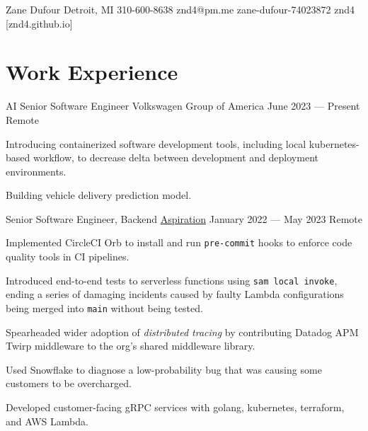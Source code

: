 \documentclass[letterpaper]{resume_config}
\newcommand{\code}[1]{\colorbox{light-gray}{\texttt{#1}}}
\begin{document}
\Header
    {Zane Dufour} %
    {Detroit, MI} %
    {310-600-8638} %
    {znd4@pm.me} %
    {zane-dufour-74023872} %
    {znd4} %
    [znd4.github.io] %


\section{Work Experience}

\WorkExperience
    {AI Senior Software Engineer} %
    {Volkswagen Group of America} %
    {June 2023 --- Present} %
    {Remote} %
    {
        \item Introducing containerized software development tools, including local kubernetes-based workflow, to decrease delta between development and deployment environments.
        \item Building vehicle delivery prediction model.
    } 

\WorkExperience
    {Senior Software Engineer, Backend} %
    {\href{https://www.aspiration.com/}{Aspiration}} %
    {January 2022 --- May 2023} %
    {Remote} %
    {
        \item Implemented CircleCI Orb to install and run \code{pre-commit} hooks to enforce code quality tools in CI pipelines.
        \item Introduced end-to-end tests to serverless functions using \code{sam local invoke}, ending a series of damaging incidents caused by faulty Lambda configurations being merged into \code{main} without being tested.
        \item Spearheaded wider adoption of \textit{distributed tracing} by contributing Datadog APM Twirp middleware to the org's shared middleware library.
        \item Used Snowflake to diagnose a low-probability bug that was causing some customers to be overcharged.
        \item Developed customer-facing gRPC services with golang, kubernetes, terraform, and AWS Lambda.
    }
\end{document}
